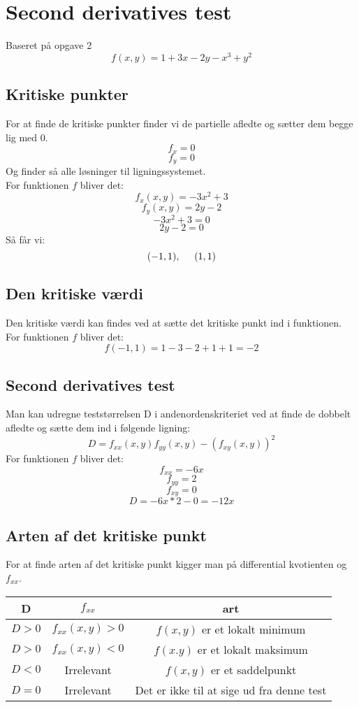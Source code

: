 \documentclass{article}
\begin{document}
\newpage

\section{Second derivatives test}
{\tiny Baseret på opgave 2}
$$f(x,y)=1+3x-2y-x^3+y^2$$

\subsection{Kritiske punkter}
For at finde de kritiske punkter finder vi de partielle afledte og sætter dem 
begge lig med 0.
$$f_x = 0$$
$$f_y = 0$$
Og finder så alle løsninger til ligningssystemet.\\
For funktionen $f$ bliver det:
$$f_x(x,y) = -3x^2+3$$
$$f_y(x,y) = 2y-2$$
$$-3x^2+3=0$$
$$2y-2=0$$
Så får vi:
$$(-1,1), \hspace{5mm} (1,1)$$

\subsection{Den kritiske værdi}
Den kritiske værdi kan findes ved at sætte det kritiske punkt ind i funktionen. 
For funktionen $f$ bliver det:
$$f(-1,1) = 1-3-2+1+1 = -2$$

\subsection{Second derivatives test}
Man kan udregne teststørrelsen D i andenordenskriteriet ved at finde de dobbelt 
afledte og sætte dem ind i følgende ligning:
$$D=f_{xx}(x,y)f_{yy}(x,y)-(f_{xy}(x,y))^2$$
For funktionen $f$ bliver det:
$$f_{xx} = -6x$$
$$f_{yy} = 2$$
$$f_{xy} = 0$$
$$D=-6x*2-0 = -12x$$

\subsection{Arten af det kritiske punkt}
For at finde arten af det kritiske punkt kigger man på differential kvotienten 
og $f_{xx}$.\\
\renewcommand{\arraystretch}{1.4}
\begin{center}
\begin{tabular}{c | c | c}
D & $f_{xx}$ & art\\
\hline 
$D > 0$ & $f_{xx}(x,y) > 0$ & $f(x,y)$ er et lokalt minimum\\
\hline
$D > 0$ & $f_{xx}(x,y) < 0$ & $f(x.y)$ er et lokalt maksimum\\
\hline
$D < 0$ & Irrelevant & $f(x,y)$ er et saddelpunkt\\
\hline
$D = 0$ & Irrelevant & Det er ikke til at sige ud fra denne test

\end{tabular}
\end{center}
\end{document}

